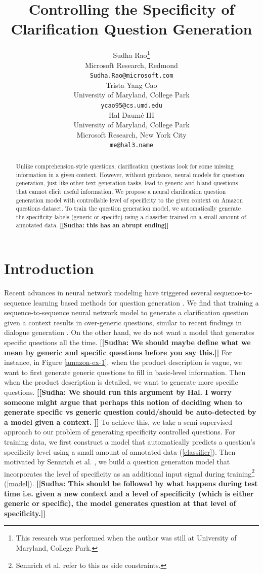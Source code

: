 \documentclass[11pt]{article}
\title{Controlling the Specificity of Clarification Question Generation}
\author{Sudha Rao\thanks{This research was performed when the author was still at University of Maryland, College Park.} \\
Microsoft Research, Redmond \\
{\tt Sudha.Rao@microsoft.com} \\ \And
Trista Yang Cao \\
University of Maryland, College Park \\
{\tt ycao95@cs.umd.edu} \\ \And
Hal Daum\'e III \\
University of Maryland, College Park \\
Microsoft Research, New York City\\
{\tt me@hal3.name} }
\date{}
\newcommand{\sudha}[1]{\textbf{\textsf{\textcolor{blue!80!white}{\footnotesize [[Sudha: #1]]}}}}
\begin{document}
\maketitle
\begin{abstract}
Unlike comprehension-style questions, clarification questions look for some missing information in a given context. 
However, without guidance, neural models for question generation, just like other text generation tasks, lead to generic and bland questions that cannot elicit useful information. 
We propose a neural clarification question generation model with controllable level of specificity to the given context on Amazon questions dataset. 
To train the question generation model, we automatically generate the specificity labels (generic or specific) using a classifier trained on a small amount of annotated data. \sudha{this has an abrupt ending} 

\end{abstract}


\section{Introduction}
\label{intro}
Recent advances in neural network modeling have triggered several sequence-to-sequence learning \cite{sutskever2014sequence} based methods for question generation \cite{serban2016generating,duan2017question,du2017learning}. 
We find that training a sequence-to-sequence neural network model to generate a clarification question given a context results in over-generic questions, similar to recent findings in dialogue generation \cite{li2016deep}. 
On the other hand, we do not want a model that generates specific questions all the time. \sudha{We should maybe define what we mean by generic and specific questions before you say this.}
For instance, in Figure \ref{amazon-ex-1}, when the product description is vague, we want to first generate generic questions to fill in basic-level information.
Then when the product description is detailed, we want to generate more specific questions. \sudha{We should run this argument by Hal. I worry someone might argue that perhaps this notion of deciding when to generate specific vs generic question could/should be auto-detected by a model given a context. }
To achieve this, we take a semi-supervised approach to our problem of generating specificity controlled questions. For training data, we first construct a model that automatically predicts a question's specificity level using a small amount of annotated data (\cref{classifier}).  
Then motivated by Sennrich et al. \cite{sennrich2016controlling}, we build a question generation model that incorporates the level of specificity as an additional input signal during training\footnote{Sennrich et al. \cite{sennrich2016controlling} refer to this as side constraints.} (\cref{model}). \sudha{This should be followed by what happens during test time i.e. given a new context and a level of specificity (which is either generic or specific), the model generates question at that level of specificity.} 
\end{document}
